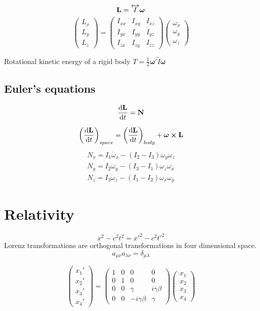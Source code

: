 \documentclass[12pt]{article}
\begin{document}
\[\vb{L}=\overleftrightarrow{I}\bm{\omega}\]
\[
\begin{pmatrix}
L_x\\L_y\\L_z
\end{pmatrix}
=
\begin{pmatrix}
I_{xx}& I_{xy}& I_{xz}\\
I_{yx}& I_{yy}& I_{yz}\\
I_{zx}& I_{zy}& I_{zz}
\end{pmatrix}
\begin{pmatrix}
\omega_x\\ \omega_y\\ \omega_z
\end{pmatrix}
\]

Rotational kinetic energy of a rigid body $T=\frac{1}{2}\bm{\omega}'\overleftrightarrow{I}\bm{\omega}$
\subsection*{Euler's equations}
\[\dv{\vb{L}}{t}=\vb{N}\]

\[\qty(\dv{\vb{L}}{t})_{space}=\qty(\dv{\vb{L}}{t})_{body}+\bm{\omega}\cp\vb{L}\]
\begin{align*}
N_x=I_1\dot{\omega}_x-(I_2-I_3){\omega}_y{\omega}_z\\
N_y=I_2\dot{\omega}_y-(I_3-I_1){\omega}_z{\omega}_x\\
N_z=I_3\dot{\omega}_z-(I_1-I_2){\omega}_x{\omega}_y
\end{align*}
\section*{Relativity}

\[x^2-c^2t^2=x'^2-c^2t'^2\]
Lorenz transformations are orthogonal transformations in four dimensional space.
\[a_{\mu\nu}a_{\lambda\nu}=\delta_{\mu\lambda}\]

\[
\begin{pmatrix}
x_1'\\ x_2'\\ x_3'\\ x_4'
\end{pmatrix}
=
\begin{pmatrix}
1& 0& 0& 0\\ 0& 1& 0& 0\\ 0& 0& \gamma& i\gamma\beta\\ 0& 0& -i\gamma\beta& \gamma
\end{pmatrix}
\begin{pmatrix}
x_1\\ x_2\\ x_3\\ x_4
\end{pmatrix}
\]
\end{document}
